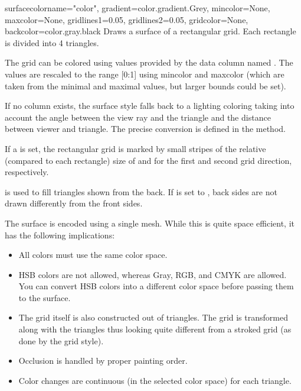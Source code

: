 \begin{classdesc}{surface}{colorname="color", %
                           gradient=color.gradient.Grey,
                           mincolor=None, maxcolor=None,
                           gridlines1=0.05, gridlines2=0.05,
                           gridcolor=None,
                           backcolor=color.gray.black}
  Draws a surface of a rectangular grid. Each rectangle is divided
  into 4 triangles.

  The grid can be colored using values provided by the data column
  named . The values are rescaled to the range [0:1]
  using mincolor and maxcolor (which are taken from the minimal and
  maximal values, but larger bounds could be set).

  If no  column exists, the surface style falls back
  to a lighting coloring taking into account the angle between the
  view ray and the triangle and the distance between viewer and
  triangle. The precise conversion is defined in the
   method.

  If a  is set, the rectangular grid is marked by small
  stripes of the relative (compared to each rectangle) size of
   and  for the first and second grid
  direction, respectively.

   is used to fill triangles shown from the back. If
   is set to , back sides are not drawn
  differently from the front sides.

  The surface is encoded using a single mesh. While this is quite
  space efficient, it has the following implications:
  \begin{itemize}
    \item All colors must use the same color space.
    \item HSB colors are not allowed, whereas Gray, RGB, and CMYK are
    allowed. You can convert HSB colors into a different color space
    before passing them to the surface.
    \item The grid itself is also constructed out of triangles. The
    grid is transformed along with the triangles thus looking quite
    different from a stroked grid (as done by the grid style).
    \item Occlusion is handled by proper painting order.
    \item Color changes are continuous (in the selected color
    space) for each triangle.
  \end{itemize}
\end{classdesc} %

